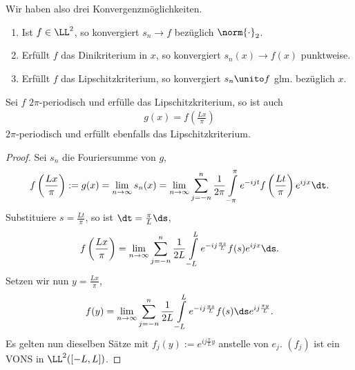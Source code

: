 Wir haben also drei Konvergenzmöglichkeiten.
\begin{enumerate}
  \item Ist $f\in\LL^2$, so konvergiert $s_n\to f$ bezüglich $\norm{\cdot}_2$.
  \item Erfüllt $f$ das Dinikriterium in $x$, so konvergiert
  $s_n(x)\to f(x)$ punktweise.
  \item Erfüllt $f$ das Lipschitzkriterium, so konvergiert $s_n\unito f$ glm.
  bezüglich $x$.
\end{enumerate}

\begin{prop}
\label{prop:1.59}
Sei $f$ $2\pi$-periodisch und erfülle das Lipschitzkriterium, so ist auch
\begin{align*}
g(x) = f\left(\frac{Lx}{\pi}\right)
\end{align*}
$2\pi$-periodisch und erfüllt ebenfalls das Lipschitzkriterium.\fishhere
\end{prop}
\begin{proof}
Sei $s_n$ die Fouriersumme von $g$,
\begin{align*}
f\left(\frac{Lx}{\pi}\right) := g(x) = \lim\limits_{n\to\infty} s_n(x) = 
\lim\limits_{n\to\infty} \sum\limits_{j=-n}^n \frac{1}{2\pi}
\int\limits_{-\pi}^\pi e^{-ijt}f\left(\frac{Lt}{\pi}\right)e^{ijx}\dt.
\end{align*}
Substituiere $s = \frac{Lt}{\pi}$, so ist $\dt = \frac{\pi}{L}\ds$,
\begin{align*}
f\left(\frac{Lx}{\pi}\right) = \lim\limits_{n\to\infty} \sum\limits_{j=-n}^n
\frac{1}{2L}\int\limits_{-L}^L
e^{-ij\frac{\pi s}{L}}f(s)e^{ijx}\ds.
\end{align*}
Setzen wir nun $y = \frac{Lx}{\pi}$,
\begin{align*}
f(y) = \lim\limits_{n\to\infty} \sum\limits_{j=-n}^n
\frac{1}{2L}\int\limits_{-L}^L
e^{-ij\frac{\pi s}{L}}f(s)\ds e^{ij\frac{\pi y}{L}}.
\end{align*}
Es gelten nun dieselben Sätze mit $f_j(y) := e^{ij\frac{\pi}{L}y}$ anstelle von
$e_j$. $(f_j)$ ist ein VONS in $\LL^2([-L,L])$.\qedhere
\end{proof}

